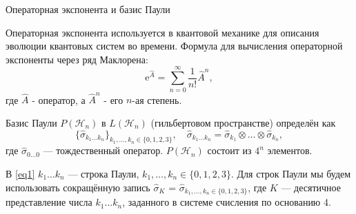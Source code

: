 \documentclass[9pt,pdf,hyperref={unicode=true}]{beamer}
\begin{document}

\begin{frame}[t]{Операторная экспонента и базис Паули}

Операторная экспонента используется в квантовой механике для описания эволюции квантовых систем во времени. Формула для вычисления операторной экспоненты через ряд Маклорена:
\begin{equation}
\text{e}^{\hat{A}}=\sum^{\infty}_{n=0}\frac{1}{n!} \hat{A}^n,
\end{equation}
где $\hat{A}$ - оператор, а $\hat{A}^n$ - его $n$-ая степень.

\vspace{0.3cm}

Базис Паули $P(\mathcal{H}_n)$ в $L(\mathcal{H}_n)$ (гильбертовом пространстве) определён как
\begin{equation} \label{eq1}
\{\hat{\sigma}_{k_1\ldots k_n}\}_{k_1,\ldots,k_n\in\{0,1,2,3\}},\quad \hat{\sigma}_{k_1\ldots k_n}=\hat{\sigma}_{k_1}\otimes \ldots \otimes \hat{\sigma}_{k_n},
\end{equation}
где $\hat{\sigma}_{0 \ldots 0}$ --- тождественный оператор. $P(\mathcal{H}_n)$ состоит из $4^n$ элементов.

В  \eqref{eq1} $k_1\ldots k_n$ --- строка Паули, $k_1, \ldots,  k_n \in \{0,1,2,3\}$. Для строк Паули мы будем использовать сокращённую запись $\hat{\sigma}_K$ = $\hat{\sigma}_{k_1,\ldots, k_n \in \{0,1,2,3\}}$, где $K$ --- десятичное представление числа $k_1\ldots k_n$, заданного в системе счисления по основанию 4.

\end{frame}

\end{document}
